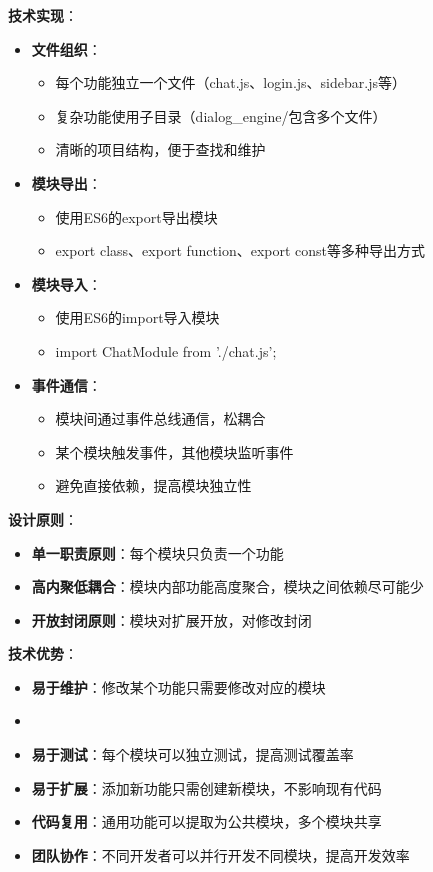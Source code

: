 \documentclass[12pt,a4paper]{article}
\begin{document}
\textbf{技术实现}：
\begin{itemize}
    \item \textbf{文件组织}：
        \begin{itemize}
            \item 每个功能独立一个文件（chat.js、login.js、sidebar.js等）
            \item 复杂功能使用子目录（dialog\_engine/包含多个文件）
            \item 清晰的项目结构，便于查找和维护
        \end{itemize}
    \item \textbf{模块导出}：
        \begin{itemize}
            \item 使用ES6的export导出模块
            \item export class、export function、export const等多种导出方式
        \end{itemize}
    \item \textbf{模块导入}：
        \begin{itemize}
            \item 使用ES6的import导入模块
            \item import { ChatModule } from './chat.js';
        \end{itemize}
    \item \textbf{事件通信}：
        \begin{itemize}
            \item 模块间通过事件总线通信，松耦合
            \item 某个模块触发事件，其他模块监听事件
            \item 避免直接依赖，提高模块独立性
        \end{itemize}
\end{itemize}

\textbf{设计原则}：
\begin{itemize}
    \item \textbf{单一职责原则}：每个模块只负责一个功能
    \item \textbf{高内聚低耦合}：模块内部功能高度聚合，模块之间依赖尽可能少
    \item \textbf{开放封闭原则}：模块对扩展开放，对修改封闭
\end{itemize}

\textbf{技术优势}：
\begin{itemize}
    \item \textbf{易于维护}：修改某个功能只需要修改对应的模块
    \item \item \textbf{易于测试}：每个模块可以独立测试，提高测试覆盖率
    \item \textbf{易于扩展}：添加新功能只需创建新模块，不影响现有代码
    \item \textbf{代码复用}：通用功能可以提取为公共模块，多个模块共享
    \item \textbf{团队协作}：不同开发者可以并行开发不同模块，提高开发效率
\end{itemize}
\end{document}
